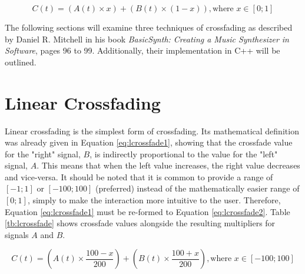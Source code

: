 \documentclass[12pt,twoside]{report}
\begin{document}
\begin{equation}
  C(t) = (A(t) \times x) + (B(t) \times (1 - x)), \text{where } x \in [0;1]
  \label{eq:lcrossfade1}
\end{equation}


The following sections will examine three techniques of crossfading as described by Daniel R. Mitchell in his book \emph{BasicSynth: Creating a Music Synthesizer in Software}, pages 96 to 99. Additionally, their implementation in C++ will be outlined.

\section{Linear Crossfading}

Linear crossfading is the simplest form of crossfading. Its mathematical definition was already given in Equation \ref{eq:lcrossfade1}, showing that the crossfade value for the "right" signal, $B$, is indirectly proportional to the value for the "left" signal, $A$. This means that when the left value increases, the right value decreases and vice-versa. It should be noted that it is common to provide a range of $[-1;1]$ or $[-100;100]$ (preferred) instead of the mathematically easier range of $[0;1]$, simply to make the interaction more intuitive to the user. Therefore, Equation \ref{eq:lcrossfade1} must be re-formed to Equation \ref{eq:lcrossfade2}. Table \ref{tb:lcrossfade} shows crossfade values alongside the resulting multipliers for signals $A$ and $B$.

\begin{equation}
  C(t) = (A(t) \times \frac{100 - x}{200}) + (B(t) \times \frac{100 + x}{200}), \text{where } x \in [-100;100]
  \label{eq:lcrossfade2}
\end{equation}
\end{document}

